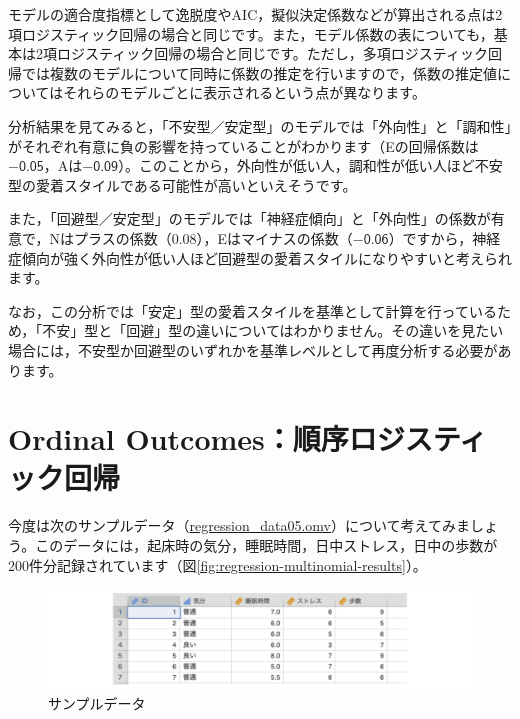 \documentclass[
  12pt,
  a5jpaper,
  lualatex, ja=standard]{bxjsbook}
\begin{document}
モデルの適合度指標として逸脱度やAIC，擬似決定係数などが算出される点は2項ロジスティック回帰の場合と同じです。また，モデル係数の表についても，基本は2項ロジスティック回帰の場合と同じです。ただし，多項ロジスティック回帰では複数のモデルについて同時に係数の推定を行いますので，係数の推定値についてはそれらのモデルごとに表示されるという点が異なります。

分析結果を見てみると，「不安型／安定型」のモデルでは「外向性」と「調和性」がそれぞれ有意に負の影響を持っていることがわかります（Eの回帰係数は\(-\textsf{0.05}\)，Aは\(-\textsf{0.09}\)）。このことから，外向性が低い人，調和性が低い人ほど不安型の愛着スタイルである可能性が高いといえそうです。

また，「回避型／安定型」のモデルでは「神経症傾向」と「外向性」の係数が有意で，Nはプラスの係数（0.08），Eはマイナスの係数（\(-\textsf{0.06}\)）ですから，神経症傾向が強く外向性が低い人ほど回避型の愛着スタイルになりやすいと考えられます。

なお，この分析では「安定」型の愛着スタイルを基準として計算を行っているため，「不安」型と「回避」型の違いについてはわかりません。その違いを見たい場合には，不安型か回避型のいずれかを基準レベルとして再度分析する必要があります。

\hypertarget{sec:regression-ordinal}{%
\section{Ordinal Outcomes：順序ロジスティック回帰}\label{sec:regression-ordinal}}

今度は次のサンプルデータ（\href{https://github.com/sbtseiji/jmv_compguide/raw/main/data/omv/regression_data05.omv}{regression\_data05.omv}）について考えてみましょう。このデータには，起床時の気分，睡眠時間，日中ストレス，日中の歩数が200件分記録されています（図\ref{fig:regression-multinomial-results}）。

\begin{figure}[!ht]

{\centering \includegraphics[width=1\linewidth]{images/regression/data05} 

}

\caption{サンプルデータ}\label{fig:regression-data05}
\end{figure}
\end{document}
